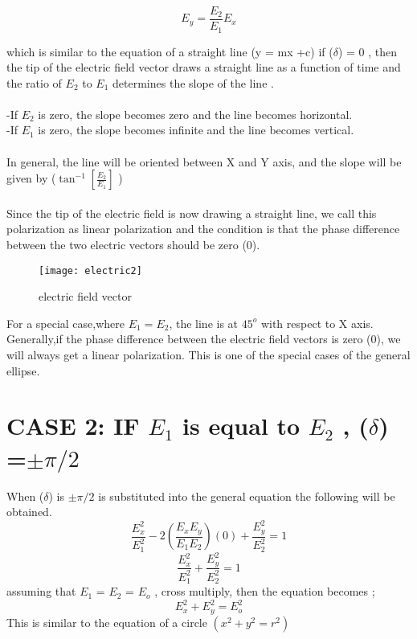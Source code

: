 \begin{equation}
E_y = \frac{E_2}{E_1}E_x
\end{equation}

which is similar to the equation of a straight line (y = mx +c)
if ($\delta$) = 0 , then the tip of the electric field vector draws a straight line as a function of time and the ratio of $ E_2 $ to $ E_1 $ determines the slope of the line .\\ 
\\-If $ E_2 $ is zero, the slope becomes zero and the line becomes horizontal.\\
-If $ E_1 $ is zero, the slope becomes infinite and the line becomes vertical. \\ 
   \\In general, the line will be oriented between X and Y axis, and the slope will be given by ($ \tan^{-1}[\frac{E_2}{E_1}]$ )\\ 
\\Since the tip of the electric field is now drawing a straight line, we call this polarization as linear polarization and the condition is that the phase difference between the two electric vectors should be zero (0).

\begin{figure}
	\centering
	\texttt{[image: electric2]}
	\caption{electric field vector}
\end{figure}

For a special case,where $  E_1=E_2 $, the line is at $ 45^{o}$ with respect to X axis.
Generally,if the phase difference between the electric field vectors is zero (0), we will always get a linear polarization. This is one of the special cases of the general ellipse.
\section{CASE 2: IF $ E_1 $ is equal to $ E_2 $ , ($\delta$) =$ \pm \pi/2$ }
When ($\delta$) is $\pm \pi/2$ is substituted into the general equation the  following will be obtained.
\begin{equation}
\frac{E_{x}^2}{E_{1}^2} -2(\frac{E_{x}E_{y}}{E_{1}E_{2}})(0) + \frac{E_{y}^2}{E_{2}^2} = 1
\end{equation}
\begin{equation}
\frac{E_{x}^2}{E_{1}^2} + \frac{E_{y}^2}{E_{2}^2} = 1
\end{equation}
assuming that $ E_1 $ = $ E_2 $ = $ E_{o} $ , cross multiply, then the equation becomes ;
\begin{equation}
{E_{x}^2} + {E_{y}^2} = {E_{o}^2}
\end{equation}
This is similar to the equation of a circle $(x^2 + y^2 = r^2)$ \\

